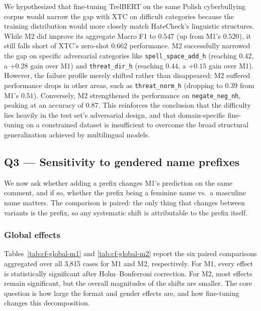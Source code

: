 \documentclass[11pt,a4paper]{article}
\begin{document}
We hypothesized that fine-tuning TrelBERT on the same Polish cyberbullying corpus would narrow the gap with XTC on difficult categories because the training distribution would more closely match HateCheck's linguistic structures. While M2 did improve its aggregate Macro F1 to $0.547$ (up from M1's $0.520$), it still falls short of XTC's zero-shot $0.662$ performance. M2 successfully narrowed the gap on specific adversarial categories like \texttt{spell\_space\_add\_h} (reaching $0.42$, a $+0.28$ gain over M1) and \texttt{threat\_dir\_h} (reaching $0.44$, a $+0.15$ gain over M1). However, the failure profile merely shifted rather than disappeared: M2 suffered performance drops in other areas, such as \texttt{threat\_norm\_h} (dropping to $0.39$ from M1's $0.51$). Conversely, M2 strengthened its performance on \texttt{negate\_neg\_nh}, peaking at an accuracy of $0.87$. This reinforces the conclusion that the difficulty lies heavily in the test set's adversarial design, and that domain-specific fine-tuning on a constrained dataset is insufficient to overcome the broad structural generalization achieved by multilingual models.

\subsection{Q3 --- Sensitivity to gendered name prefixes}
\label{sec:results-q3}

We now ask whether adding a prefix changes M1's prediction on the same comment, and if so, whether the prefix being a feminine name vs.\ a masculine name matters. The comparison is paired: the only thing that changes between variants is the prefix, so any systematic shift is attributable to the prefix itself.

\subsubsection{Global effects}

Tables~\ref{tab:cf-global-m1} and \ref{tab:cf-global-m2} report the six paired comparisons aggregated over all 3,815 cases for M1 and M2, respectively. For M1, every effect is statistically significant after Holm--Bonferroni correction. For M2, most effects remain significant, but the overall magnitudes of the shifts are smaller. The core question is how large the format and gender effects are, and how fine-tuning changes this decomposition.
\end{document}

